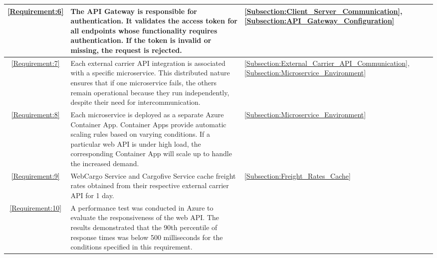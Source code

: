 \documentclass[12pt, reqno, oneside]{amsbook}
\theoremstyle{definition}
\theoremstyle{definition}
\numberwithin{section}{chapter}
\numberwithin{table}{chapter}
\numberwithin{figure}{chapter}
\begin{document}
\begin{longtable}{|c|m{280pt}|M{65pt}|}
  \hline
  \ref{Requirement:6}
   & The \ac{API} Gateway is responsible for authentication. It validates the access token for all endpoints whose functionality requires authentication. If the token is invalid or missing, the request is rejected.
   & \ref{Subsection:Client_Server_Communication}, \ref{Subsection:API_Gateway_Configuration}                                                                                                                                                                                                  \\
  \hline
  \ref{Requirement:7}
   & Each external carrier \ac{API} integration is associated with a specific microservice. This distributed nature ensures that if one microservice fails, the others remain operational because they run independently, despite their need for intercommunication.
   & \ref{Subsection:External_Carrier_API_Communication}, \ref{Subsection:Microservice_Environment}                                                                                                                                                                                            \\
  \hline
  \ref{Requirement:8}
   & Each microservice is deployed as a separate Azure Container App. Container Apps provide automatic scaling rules based on varying conditions. If a particular web \ac{API} is under high load, the corresponding Container App will scale up to handle the increased demand.
   & \ref{Subsection:Microservice_Environment}                                                                                                                                                                                                                                                 \\
  \hline
  \ref{Requirement:9}
   & WebCargo Service and Cargofive Service cache freight rates obtained from their respective external carrier \ac{API} for 1 day.
   & \ref{Subsection:Freight_Rates_Cache}                                                                                                                                                                                                                                                      \\
  \hline
  \ref{Requirement:10}
   & A performance test was conducted in Azure to evaluate the responsiveness of the web \ac{API}. The results demonstrated that the 90th percentile of response times was below 500 milliseconds for the conditions specified in this requirement.

\end{longtable}
\end{document}
